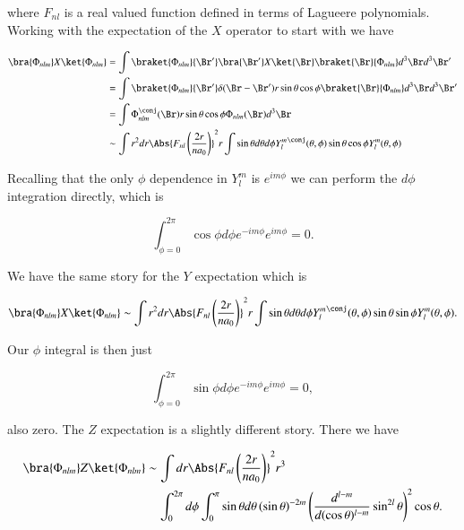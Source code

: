 where $F_{nl}$ is a real valued function defined in terms of Lagueere polynomials.  Working with the expectation of the $X$ operator to start with we have

\begin{align*}
\bra{\Phi_{nlm}} X \ket{\Phi_{nlm}} 
&=
\int 
\braket{\Phi_{nlm}}{\Br'} \bra{\Br'} X \ket{\Br} \braket{\Br}{\Phi_{nlm}} d^3 \Br d^3 \Br' \\
&=
\int 
\braket{\Phi_{nlm}}{\Br'} \delta(\Br - \Br') r \sin\theta \cos\phi \braket{\Br}{\Phi_{nlm}} d^3 \Br d^3 \Br' \\
&=
\int 
\Phi_{nlm}^\conj(\Br) r \sin\theta \cos\phi \Phi_{nlm}(\Br) d^3 \Br \\
&\sim
\int r^2 dr \Abs{ F_{nl}\left(\frac{2 r}{ n a_0} \right)}^2 r 
\int \sin\theta d\theta d\phi
{Y_l^m}^\conj(\theta, \phi) \sin\theta \cos\phi Y_l^m(\theta, \phi) \\
\end{align*}

Recalling that the only $\phi$ dependence in $Y_l^m$ is $e^{i m \phi}$ we can perform the $d\phi$ integration directly, which is

\begin{equation}\label{eqn:phy456ps1:740}
\int_{\phi=0}^{2\pi} \cos\phi d\phi e^{-i m \phi} e^{i m \phi} = 0.
\end{equation}

We have the same story for the $Y$ expectation which is

\begin{equation}\label{eqn:phy456ps1:760}
\bra{\Phi_{nlm}} X \ket{\Phi_{nlm}} 
\sim
\int r^2 dr \Abs{F_{nl}\left( \frac{2 r}{ n a_0} \right)}^2 r 
\int \sin\theta d\theta d\phi
{Y_l^m}^\conj(\theta, \phi) \sin\theta \sin\phi Y_l^m(\theta, \phi).
\end{equation}

Our $\phi$ integral is then just

\begin{equation}\label{eqn:phy456ps1:780}
\int_{\phi=0}^{2\pi} \sin\phi d\phi e^{-i m \phi} e^{i m \phi} = 0,
\end{equation}

also zero.  The $Z$ expectation is a slightly different story.  There we have

\begin{equation}\label{eqn:phy456ps1:800}
\begin{aligned}
\bra{\Phi_{nlm}} Z \ket{\Phi_{nlm}} 
&\sim
\int dr \Abs{F_{nl}\left( \frac{2 r}{ n a_0} \right)}^2 r^3  \\
&\quad \int_0^{2\pi} d\phi
\int_0^\pi \sin \theta d\theta
\left( \sin\theta \right)^{-2m}
\left( \frac{d^{l - m}}{d (\cos\theta)^{l-m}} \sin^{2l}\theta \right)^2
\cos\theta.
\end{aligned}
\end{equation}


